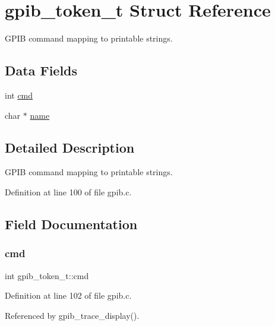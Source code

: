 \hypertarget{structgpib__token__t}{}\section{gpib\+\_\+token\+\_\+t Struct Reference}
\label{structgpib__token__t}


G\+P\+IB command mapping to printable strings.  


\subsection*{Data Fields}
\begin{DoxyCompactItemize}
\item 
int \hyperlink{structgpib__token__t_a8bc698b3cba149e3abbf935e623775c0}{cmd}
\item 
char $\ast$ \hyperlink{structgpib__token__t_aa47fb36b52bd83dc60e67a54f6e36e09}{name}
\end{DoxyCompactItemize}


\subsection{Detailed Description}
G\+P\+IB command mapping to printable strings. 

Definition at line 100 of file gpib.\+c.



\subsection{Field Documentation}
\mbox{\label{structgpib__token__t_a8bc698b3cba149e3abbf935e623775c0}} 
\subsubsection{\texorpdfstring{cmd}{cmd}}
{\footnotesize\ttfamily int gpib\+\_\+token\+\_\+t\+::cmd}



Definition at line 102 of file gpib.\+c.



Referenced by gpib\+\_\+trace\+\_\+display().

\mbox{\label{structgpib__token__t_aa47fb36b52bd83dc60e67a54f6e36e09}} 
